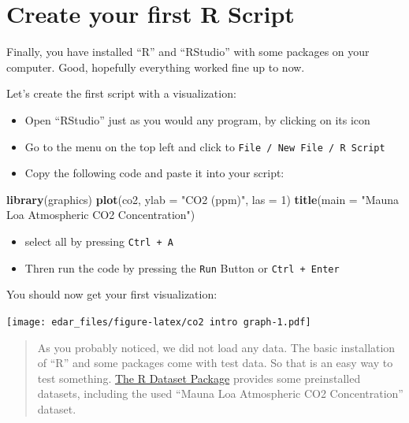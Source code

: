 \documentclass[
  a4paperpaper,
]{book}
\newenvironment{Shaded}{\begin{snugshade}}{\end{snugshade}}
\newcommand{\DataTypeTok}[1]{\textcolor[rgb]{0.13,0.29,0.53}{#1}}
\newcommand{\DecValTok}[1]{\textcolor[rgb]{0.00,0.00,0.81}{#1}}
\newcommand{\KeywordTok}[1]{\textcolor[rgb]{0.13,0.29,0.53}{\textbf{#1}}}
\newcommand{\NormalTok}[1]{#1}
\newcommand{\StringTok}[1]{\textcolor[rgb]{0.31,0.60,0.02}{#1}}
\let\oldShaded\Shaded
\let\endoldShaded\endShaded
\renewenvironment{Shaded}{\footnotesize\oldShaded}{\endoldShaded}
\begin{document}
\newpage

\hypertarget{createFirstScript}{%
\section{Create your first R Script}\label{createFirstScript}}

Finally, you have installed ``R'' and ``RStudio'' with some packages on your computer. Good, hopefully everything worked fine up to now.

Let's create the first script with a visualization:

\begin{itemize}
\item
  Open ``RStudio'' just as you would any program, by clicking on its icon
\item
  Go to the menu on the top left and click to \texttt{File\ /\ New\ File\ /\ R\ Script}
\item
  Copy the following code and paste it into your script:
\end{itemize}

\begin{Shaded}
\begin{Highlighting}[]
\KeywordTok{library}\NormalTok{(graphics)}
\KeywordTok{plot}\NormalTok{(co2, }\DataTypeTok{ylab =} \StringTok{"CO2 (ppm)"}\NormalTok{, }\DataTypeTok{las =} \DecValTok{1}\NormalTok{)}
\KeywordTok{title}\NormalTok{(}\DataTypeTok{main =} \StringTok{"Mauna Loa Atmospheric CO2 Concentration"}\NormalTok{)}
\end{Highlighting}
\end{Shaded}

\begin{itemize}
\item
  select all by pressing \texttt{Ctrl\ +\ A}
\item
  Thren run the code by pressing the \texttt{Run} Button or \texttt{Ctrl\ +\ Enter}
\end{itemize}

You should now get your first visualization:

\texttt{[image: edar\_files/figure-latex/co2 intro graph-1.pdf]}

\begin{quote}
As you probably noticed, we did not load any data. The basic installation of ``R'' and some packages come with test data. So that is an easy way to test something. \href{https://stat.ethz.ch/R-manual/R-devel/library/datasets/html/00Index.html}{The R Dataset Package} provides some preinstalled datasets, including the used ``Mauna Loa Atmospheric CO2 Concentration'' dataset.
\end{quote}
\end{document}
